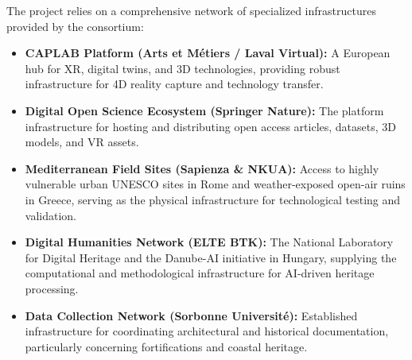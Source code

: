 
\noindent
The project relies on a comprehensive network of specialized infrastructures provided by the consortium:
\begin{itemize}
    \item \textbf{CAPLAB Platform (Arts et Métiers / Laval Virtual):} A European hub for XR, digital twins, and 3D technologies, providing robust infrastructure for 4D reality capture and technology transfer.
    \item \textbf{Digital Open Science Ecosystem (Springer Nature):} The platform infrastructure for hosting and distributing open access articles, datasets, 3D models, and VR assets.
    \item \textbf{Mediterranean Field Sites (Sapienza \& NKUA):} Access to highly vulnerable urban UNESCO sites in Rome and weather-exposed open-air ruins in Greece, serving as the physical infrastructure for technological testing and validation.
    \item \textbf{Digital Humanities Network (ELTE BTK):} The National Laboratory for Digital Heritage and the Danube-AI initiative in Hungary, supplying the computational and methodological infrastructure for AI-driven heritage processing.
    \item \textbf{Data Collection Network (Sorbonne Université):} Established infrastructure for coordinating architectural and historical documentation, particularly concerning fortifications and coastal heritage.
\end{itemize}
